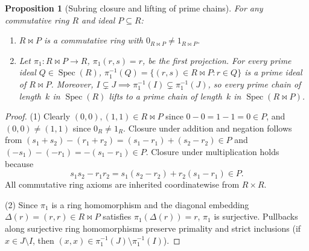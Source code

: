 \documentclass[11pt]{article}
\newtheorem{proposition}[theorem]{Proposition}
\theoremstyle{definition}
\newcommand{\Spec}{\operatorname{Spec}}
\begin{document}
\begin{proposition}[Subring closure and lifting of prime chains]\label{prop:dup-ring}
For any commutative ring $R$ and ideal $P \subseteq R$:
\begin{enumerate}
  \item $R \bowtie P$ is a commutative ring with $0_{R \bowtie P} \neq 1_{R \bowtie P}$.
  \item Let $\pi_1 : R \bowtie P \to R$, $\pi_1(r, s) = r$, be the first projection. For
  every prime ideal $Q \in \Spec(R)$, $\pi_1^{-1}(Q) = \{(r, s) \in R \bowtie P : r \in Q\}$
  is a prime ideal of $R \bowtie P$. Moreover, $I \subsetneq J \implies \pi_1^{-1}(I) \subsetneq \pi_1^{-1}(J)$,
  so every prime chain of length~$k$ in $\Spec(R)$ lifts to a prime chain of length~$k$
  in $\Spec(R \bowtie P)$.
\end{enumerate}
\end{proposition}
\begin{proof}
(1) Clearly $(0, 0), (1, 1) \in R \bowtie P$ since $0 - 0 = 1 - 1 = 0 \in P$, and
$(0, 0) \neq (1, 1)$ since $0_R \neq 1_R$. Closure under addition and negation follows from
$(s_1 + s_2) - (r_1 + r_2) = (s_1 - r_1) + (s_2 - r_2) \in P$ and $(-s_1) - (-r_1) = -(s_1 - r_1) \in P$.
Closure under multiplication holds because
\[
  s_1 s_2 - r_1 r_2 = s_1(s_2 - r_2) + r_2(s_1 - r_1) \in P.
\]
All commutative ring axioms are inherited coordinatewise from $R \times R$.

(2) Since $\pi_1$ is a ring homomorphism and the diagonal embedding
$\Delta(r) = (r, r) \in R \bowtie P$ satisfies $\pi_1(\Delta(r)) = r$, $\pi_1$ is
surjective. Pullbacks along surjective ring homomorphisms preserve primality and strict
inclusions (if $x \in J \setminus I$, then $(x, x) \in \pi_1^{-1}(J) \setminus \pi_1^{-1}(I)$).
\end{proof}
\end{document}
